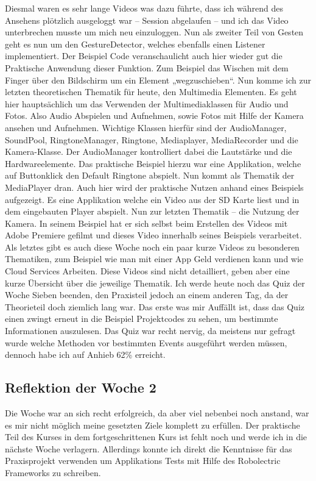 \documentclass[12pt,a4paper,bibliography=totocnumbered,listof=totocnumbered]{scrartcl}
\begin{document}
Diesmal waren es sehr lange Videos was dazu führte, dass ich während des Ansehens plötzlich ausgeloggt war – Session abgelaufen – und ich das Video unterbrechen musste um mich neu einzuloggen. 
Nun als zweiter Teil von Gesten geht es nun um den GestureDetector, welches ebenfalls einen Listener implementiert. Der Beispiel Code veranschaulicht auch hier wieder gut die Praktische Anwendung dieser Funktion. Zum Beispiel das Wischen mit dem Finger über den Bildschirm um ein Element „wegzuschieben“. 
Nun komme ich zur letzten theoretischen Thematik für heute, den Multimedia Elementen. 
Es geht hier hauptsächlich um das Verwenden der Multimediaklassen für Audio und Fotos. Also Audio Abspielen und Aufnehmen, sowie Fotos mit Hilfe der Kamera ansehen und Aufnehmen. Wichtige Klassen hierfür sind der AudioManager, SoundPool, RingtoneManager, Ringtone, Mediaplayer, MediaRecorder und die Kamera-Klasse. Der AudioManager kontrolliert dabei die Lautstärke und die Hardwareelemente. Das praktische Beispiel hierzu war eine Applikation, welche auf Buttonklick den Default Ringtone abspielt. 
Nun kommt als Thematik der MediaPlayer dran. Auch hier wird der praktische Nutzen anhand eines Beispiels aufgezeigt. Es eine Applikation welche ein Video aus der SD Karte liest und in dem eingebauten Player abspielt. Nun zur letzten Thematik – die Nutzung der Kamera. In seinem Beispiel hat er sich selbst beim Erstellen des Videos mit Adobe Premiere gefilmt und dieses Video innerhalb seines Beispiels verarbeitet. 
Als letztes gibt es auch diese Woche noch ein paar kurze Videos zu besonderen Thematiken, zum Beispiel wie man mit einer App Geld verdienen kann und wie Cloud Services Arbeiten.  Diese Videos sind nicht detailliert, geben aber eine kurze Übersicht über die jeweilige Thematik.
Ich werde heute noch das Quiz der Woche Sieben beenden, den Praxisteil jedoch an einem anderen Tag, da der Theorieteil doch ziemlich lang war. Das erste was mir Auffällt ist, dass das Quiz einen zwingt erneut in die Beispiel Projektcodes zu sehen, um bestimmte Informationen auszulesen. Das Quiz war recht nervig, da meistens nur gefragt wurde welche Methoden vor bestimmten Events ausgeführt werden müssen, dennoch habe ich auf Anhieb 62\% erreicht. 

\subsection{Reflektion der Woche 2}

Die Woche war an sich recht erfolgreich, da aber viel nebenbei noch anstand, war es mir nicht möglich meine gesetzten Ziele komplett zu erfüllen. Der praktische Teil des Kurses in dem fortgeschrittenen Kurs ist fehlt noch und werde ich in die nächste Woche verlagern. Allerdings konnte ich direkt die Kenntnisse für das Praxisprojekt verwenden um Applikations Tests mit Hilfe des Robolectric Frameworks zu schreiben.  
\end{document}
